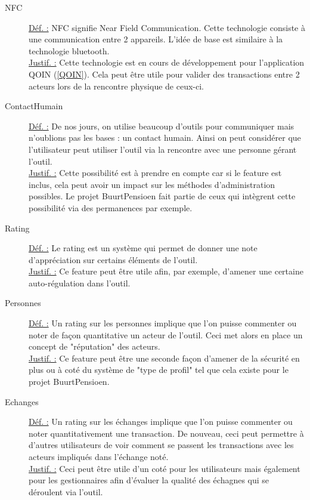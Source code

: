\begin{description}
\item [NFC]
\underline{Déf. :}  NFC signifie Near Field Communication.  Cette technologie consiste à une communication entre 2 appareils.  L'idée de base est similaire à la technologie bluetooth.
\\ \underline{Justif. :}  Cette technologie est en cours de développement pour l'application QOIN (\ref{QOIN}).  Cela peut être utile pour valider des transactions entre 2 acteurs lors de la rencontre physique de ceux-ci.
\newline

\item [ContactHumain]
\underline{Déf. :}  De nos jours,  on utilise beaucoup d'outils pour communiquer mais n'oublions pas les bases : un contact humain.  Ainsi on peut considérer que l'utilisateur peut utiliser l'outil via la rencontre avec une personne gérant l'outil.  
\\ \underline{Justif. :}  Cette possibilité est à prendre en compte car si le feature est inclus,  cela peut avoir un impact sur les méthodes d'administration possibles.  Le projet BuurtPensioen fait partie de ceux qui intègrent cette possibilité via des permanences par exemple.  
\newline

\begin{center}
\end{center}

\item [Rating]
\underline{Déf. :}  Le rating est un système qui permet de donner une note d'appréciation sur certains éléments de l'outil.
\\ \underline{Justif. :}  Ce feature peut être utile afin,  par exemple,  d'amener une certaine auto-régulation dans l'outil.
\newline

\item [Personnes]
\underline{Déf. :}  Un rating sur les personnes implique que l'on puisse commenter ou noter de façon quantitative un acteur de l'outil.  Ceci met alors en place un concept de "réputation" des acteurs.
\\ \underline{Justif. :}  Ce feature peut être une seconde façon d'amener de la sécurité en plus ou à coté du système de "type de profil" tel que cela existe pour le projet BuurtPensioen.
\newline

\item [Echanges]
\underline{Déf. :}  Un rating sur les échanges implique que l'on puisse commenter ou noter quantitativement une transaction.  De nouveau,  ceci peut permettre à d'autres utilisateurs de voir comment se passent les transactions avec les acteurs impliqués dans l'échange noté.
\\ \underline{Justif. :}  Ceci peut être utile d'un coté pour les utilisateurs mais également pour les gestionnaires afin d'évaluer la qualité des échagnes qui se déroulent via l'outil.
\newline

\end{description}

